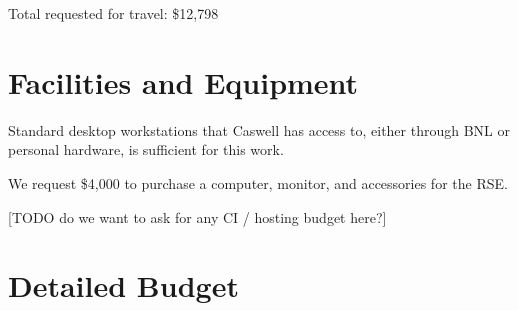 \documentclass[12pt]{article}
\numberwithin{page}{section}
\begin{document}
Total requested for travel: \$12,798


\newpage
\section{Facilities and Equipment}
\setcounter{page}{1}

Standard desktop workstations that Caswell has access to, either
through BNL or personal hardware, is sufficient for this work.

We request \$4,000 to purchase a computer, monitor, and accessories
for the RSE.


[TODO do we want to ask for any CI / hosting budget here?]



\newpage
\section{Detailed Budget}
\setcounter{page}{1}
\end{document}
